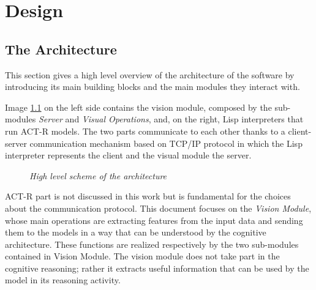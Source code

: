 \chapter{Design}\label{chDesign}
	
	\section{The Architecture}
	This section gives a high level overview of the architecture of the software by introducing its main building blocks and the main modules they interact with. 
  
	Image \ref{fig:architecture} on the left side contains the vision module, composed by the sub-modules \emph{Server} and \emph{Visual Operations}, and, on the right, \mbox{Lisp} interpreters that run \mbox{ACT-R} models.
	The two parts communicate to each other thanks to a \mbox{client-server} communication mechanism based on \mbox{TCP/IP} protocol in which the \mbox{Lisp} interpreter represents the client and the visual module the server.
	
	\begin{figure}[h]
	  \begin{center} 
	  \end{center} 
	  \caption{\textit{High level scheme of the architecture}}  
	  \label{fig:architecture}
 	\end{figure}


	\mbox{ACT-R} part is not discussed in this work but is fundamental for the choices about the communication protocol.
	This document focuses on the \emph{Vision Module}, whose main operations are extracting features from the input data and sending them to the models in a way that can be understood by the cognitive architecture. 
	These functions are realized respectively by the two sub-modules contained in Vision Module.
	The vision module does not take part in the cognitive reasoning; rather it extracts useful information that can be used by the model in its reasoning activity.

